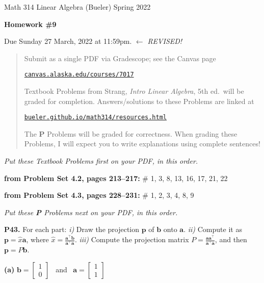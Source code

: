\documentclass[12pt]{amsart}
\newcommand{\ba}{\bm{a}}
\newcommand{\bb}{\bm{b}}
\newcommand{\bp}{\bm{p}}
\newcommand{\ds}{\displaystyle}
\newcommand{\prob}[1]{\bigskip\noindent\textbf{#1.}\quad }
\newcommand{\probset}[2]{\bigskip\noindent\textbf{from Problem Set #1, pages #2:}\quad }
\newcommand{\epart}[1]{\medskip\noindent\textbf{(#1)}\quad }
\begin{document}
\scriptsize \noindent Math 314 Linear Algebra (Bueler) \hfill Spring 2022
\normalsize\medskip

\Large
\centerline{\textbf{Homework \#9}}

\bigskip
\large
\centerline{Due Sunday 27 March, 2022 at 11:59pm. \qquad $\gets$ \emph{REVISED!}}

\normalsize
\bigskip
\begin{quote}
\medskip
\noindent Submit as a single PDF via Gradescope; see the Canvas page

\href{https://canvas.alaska.edu/courses/7017}{\texttt{canvas.alaska.edu/courses/7017}}

\noindent Textbook Problems from Strang, \emph{Intro Linear Algebra}, 5th ed.~will be graded for completion.  Answers/solutions to these Problems are linked at

\href{https://bueler.github.io/math314/resources.html}{\texttt{bueler.github.io/math314/resources.html}}

\noindent The \textbf{P} Problems will be graded for correctness.  When grading these Problems, I will expect you to write explanations using complete sentences!
\end{quote}
\medskip

\thispagestyle{empty}

\noindent \hrulefill

\noindent \emph{Put these Textbook Problems first on your PDF, in this order.}

\probset{4.2}{213--217} \# 1, 3, 8, 13, 16, 17, 21, 22

\probset{4.3}{228--231} \# 1, 2, 3, 4, 8, 9


\bigskip
\noindent \hrulefill

\noindent \emph{Put these \textbf{P} Problems next on your PDF, in this order.}

\prob{P43}  For each part: \emph{i)} Draw the projection $\bp$ of $\bb$ onto $\ba$.  \emph{ii)} Compute it as $\bp = \hat x \ba$, where $\ds \hat x = \frac{\ba^\top \bb}{\ba^\top \ba}$.  \emph{iii)} Compute the projection matrix $\ds P = \frac{\ba \ba^\top}{\ba^\top \ba}$, and then $\bp = P\bb$.

\epart{a}  $\ds \bb = \begin{bmatrix} 1 \\ 0 \end{bmatrix}$ \, and \, $\ds \ba = \begin{bmatrix} 1 \\ 1 \end{bmatrix}$
\end{document}
